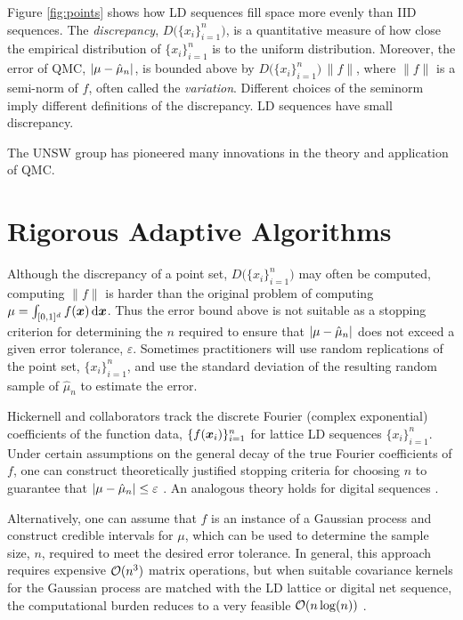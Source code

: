 \documentclass{amsart}
\begin{document}
Figure \ref{fig:points} shows how LD sequences fill space more evenly than IID sequences.  The \emph{discrepancy}, $D\bigl(\{x_i\}_{i=1}^n\bigr)$,  \cite{Hic97a,Hic99a} is a quantitative measure of how close the empirical distribution of $\{x_i\}_{i=1}^n$ is to the uniform distribution.  Moreover, the error of QMC, $\lvert \mu - \hat{\mu}_n\rvert$, is bounded above by $D\bigl(\{x_i\}_{i=1}^n\bigr) \, \lVert f\rVert$, where  $\lVert f\rVert$ is a semi-norm of $f$, often called the \emph{variation}.  Different choices of the seminorm imply different definitions of the discrepancy.  LD sequences have small discrepancy.

The UNSW group has pioneered many innovations in the theory and application of QMC.

\section{Rigorous Adaptive Algorithms}
Although the discrepancy of a point set, $D\bigl(\{x_i\}_{i=1}^n\bigr)$ may often be computed, computing $\lVert f\rVert$ is harder than the original problem of computing $\mu=\int_{[0,1]^d} f(\boldsymbol{x}) \, {\rm d} \boldsymbol{x}$.  Thus the error bound above is not suitable as a stopping criterion for determining the $n$ required to ensure that $\left \lvert \mu - \hat{\mu}_n \right \rvert$ does not exceed a given error tolerance, $\varepsilon$.  Sometimes practitioners will use random replications of the point set, $\{x_i\}_{i=1}^n$, and use the standard deviation of the resulting random sample of $\hat{\mu}_n$ to estimate the error.

Hickernell and collaborators track the discrete Fourier (complex exponential) coefficients of the function data, $\{f(\boldsymbol{x}_i)\}_{i=1}^n$ for lattice LD sequences $\{x_i\}_{i=1}^n$.  Under certain assumptions on the general decay of the true Fourier coefficients of $f$, one can construct theoretically justified stopping criteria for choosing $n$ to guarantee that $\left \lvert \mu - \hat{\mu}_n \right \rvert \le \varepsilon$ \cite{JimHic16a}.  An analogous theory holds for digital sequences \cite{HicJim16a}.

Alternatively, one can assume that $f$ is an instance of a Gaussian process and construct credible intervals for $\mu$, which can be used to determine the sample size, $n$, required to meet the desired error tolerance.  In general, this approach requires expensive $\operatorname{{\mathcal O}}(n^3)$ matrix operations, but when suitable covariance kernels for the Gaussian process are matched with the LD lattice or digital net sequence, the computational burden reduces  to a very feasible $\operatorname{{\mathcal O}}(n \log(n))$ \cite{RatHic19a,JagHic22a}.
\end{document}
